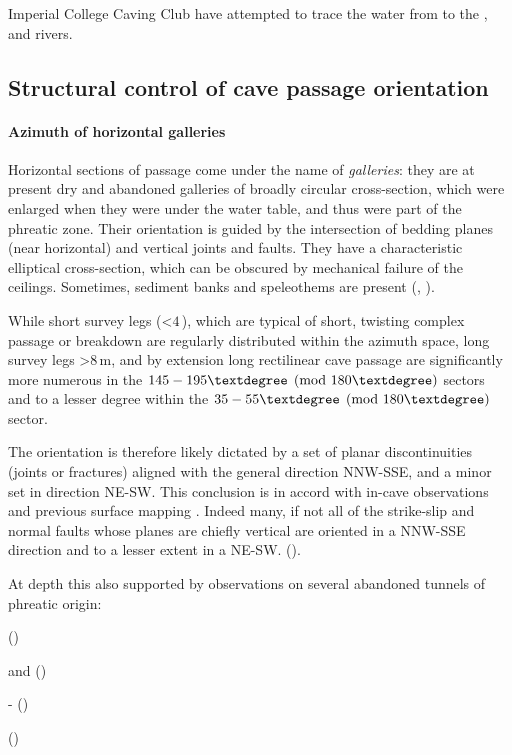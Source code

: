 Imperial College Caving Club have attempted to trace the water from  \citep{hm1} to the ,  and  rivers.
 
 
 \subsection{Structural control of cave passage orientation}
 \paragraph{Azimuth of horizontal galleries}
 Horizontal sections of passage come under the name of \emph{galleries}: they are at present dry and abandoned galleries of broadly circular cross-section, which were enlarged when they were under the water table, and thus were part of the phreatic zone. Their orientation is guided by the intersection of bedding planes (near horizontal) and vertical joints and faults. They have a characteristic elliptical cross-section, which can be obscured by mechanical failure of the ceilings. Sometimes, sediment banks and speleothems are present (, ).

While short survey legs (<$4$\,), which are typical of short, twisting complex passage or breakdown are regularly distributed within the azimuth space, long survey legs >$8$\,m, and by extension long rectilinear cave passage are significantly more numerous in the $145-195\textdegree  \pmod{180\textdegree}$  sectors and to a lesser degree within the $35-55\textdegree   \pmod{180\textdegree }$ sector.


The orientation is therefore likely dictated by a set of planar discontinuities (joints or fractures) aligned with the general direction NNW-SSE, and a minor set in direction NE-SW. This conclusion is in accord with in-cave observations \citep{hm1}  and previous surface mapping \citep{buser1986tolmavc} . Indeed many, if not all of the strike-slip and normal faults whose planes are chiefly vertical are oriented in a NNW-SSE direction and to a lesser extent in a NE-SW. ().

At depth this also supported by observations on several abandoned tunnels of phreatic origin:
 
\begin{citemize} 
\item {} ()
\item {} and   ()
 \item {} -  ()
 \item {} ()
 \end{citemize} 

